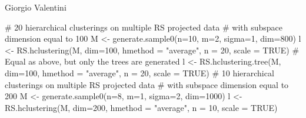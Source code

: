 \documentclass{article}
\begin{document}
\begin{Author}\relax
Giorgio Valentini 
\end{Author}
\begin{SeeAlso}\relax
{}
\end{SeeAlso}
\begin{Examples}
\begin{ExampleCode}
# 20 hierarchical clusterings on multiple RS projected data 
# with subspace dimension equal to 100
M <- generate.sample0(n=10, m=2, sigma=1, dim=800)
l <- RS.hclustering(M, dim=100, hmethod = "average", n = 20, scale = TRUE)
# Equal as above, but only the trees are generated
l <- RS.hclustering.tree(M, dim=100, hmethod = "average", n = 20, scale = TRUE)
# 10 hierarchical clusterings on multiple RS projected data 
# with subspace dimension equal to 200
M <- generate.sample0(n=8, m=1, sigma=2, dim=1000)
l <- RS.hclustering(M, dim=200, hmethod = "average", n = 10, scale = TRUE)
\end{ExampleCode}
\end{Examples}
\end{document}
